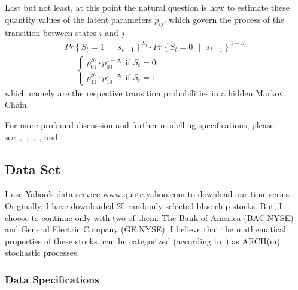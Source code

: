 \documentclass[a4paper,11pt,english]{article}
\begin{document}
				Last but not least, at this point the natural question is how to estimate these quantity values of the latent parameters $p_{ij}$, which 
				govern the process of the transition between states $i$ and $j$ 
				\begin{eqnarray*} 
					Pr\left\{S_t = 1 \text{ } | \text{ } s_{t-1} \right\}^{S_t} \cdot Pr\left\{S_t = 0 \text{ } | \text{ } s_{t-1} \right\}^{1-S_t} \\
 				= 			
					\begin{cases}
			   			p_{01}^{S_t} \cdot p_{00}^{1-S_t} \text{ if } S_t = 0 \\
			   			p_{11}^{S_t} \cdot p_{10}^{1-S_t} \text{ if } S_t = 1
					\end{cases}  
				\end{eqnarray*}
				which namely are the respective transition probabilities in a hidden Markov Chain.

				For more profound discussion and further modelling specifications, please 
				see~\citep[p.~310]{cai},~\citep[p.~280]{durland},~\citep[pp.~10--16]{lawler},~\citep[p.~125]{li}, and~\citep[pp.~280--286]{tsay}. 		
						

		
		\subsection{Data Set} \label{sec:data} 
		
		I use Yahoo's data service \url{www.quote.yahoo.com} to download our time series. Originally, I have downloaded 25 randomly selected blue chip 
		stocks. But, I choose to continue only with two of them. The Bank of America (BAC:NYSE) and General Electric Company (GE:NYSE). I believe that 
		the mathematical properties of these stocks, can be categorized (according to~\cite{engle82}) as ARCH(m) stochastic processes. 
	 

			\subsubsection{Data Specifications}
		
\end{document}
